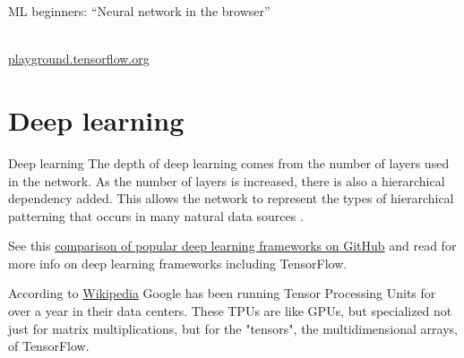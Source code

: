 \documentclass{beamer}
\begin{document}
\begin{frame}{ML beginners: ``Neural network in the browser''}

     \\
    \href{http://playground.tensorflow.org}{playground.tensorflow.org}
\end{frame}


\section{Deep learning}

\begin{frame}{Deep learning}
    The depth of deep learning comes from the number of layers used in the
    network. As the number of layers is increased, there is also a hierarchical
    dependency added. This allows the network to represent the types of
    hierarchical patterning that occurs in many natural data sources
    .

    \vspace{20px}

    See this
    \href{https://github.com/zer0n/deepframeworks/blob/master/README.md}{comparison of popular deep learning frameworks on GitHub}
    and read for more info on deep learning frameworks including TensorFlow.
\end{frame}


\begin{frame}
    According to \href{https://en.wikipedia.org/wiki/TensorFlow}{Wikipedia}
    Google has been running Tensor Processing Units for over a year in their
    data centers. These TPUs are like GPUs, but specialized not just for matrix
    multiplications, but for the "tensors", the multidimensional arrays,
    of TensorFlow.
\end{frame}
\end{document}
